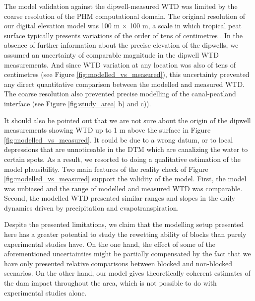 \documentclass[bg, manuscript]{copernicus}
\begin{document}
The model validation against the dipwell-measured WTD was limited by the coarse resolution of the PHM computational domain.
The original resolution of our digital elevation model was 100 \unit{m} $\times$ 100 \unit{m}, a scale in which tropical peat surface typically presents variations of the order of tens of centimetres \citep{lampelaGroundSurfaceMicrotopography2016}.
In the absence of further information about the precise  elevation of the dipwells, we assumed an uncertainty of comparable magnitude in the dipwell WTD measurements.
And since WTD  variation at any location was also of  tens of centimetres (see Figure \ref{fig:modelled_vs_measured}), this uncertainty prevented any direct quantitative comparison between the modelled and measured WTD.
The coarse resolution also prevented precise modelling of the canal-peatland interface (see Figure \ref{fig:study_area} b) and c)).

It should also be pointed out that we are not sure about the origin of the dipwell measurements showing WTD up to 1 m above the surface in Figure \ref{fig:modelled_vs_measured}.
It could be due to a wrong datum, or to local depressions that are unnoticeable in the DTM which are canalizing the water to certain spots.
As a result, we  resorted to doing a qualitative estimation of the model plausibility.
Two main features of the reality check of Figure \ref{fig:modelled_vs_measured} support the validity of the model.
First, the model was unbiased and the range of modelled and measured WTD was comparable.
Second,  the modelled WTD presented similar ranges and slopes in the daily dynamics driven by precipitation and evapotranspiration.


Despite the presented limitations, we claim that the modelling setup presented here has a greater potential to study the rewetting ability of blocks than purely experimental studies have.
On the one hand, the effect of some of the aforementioned uncertainties might be partially compensated by the fact that we have only presented relative comparisons between blocked and non-blocked scenarios.
On the other hand, our model gives theoretically coherent estimates of the dam impact throughout the area, which is not possible to do  with  experimental studies alone.
\end{document}
